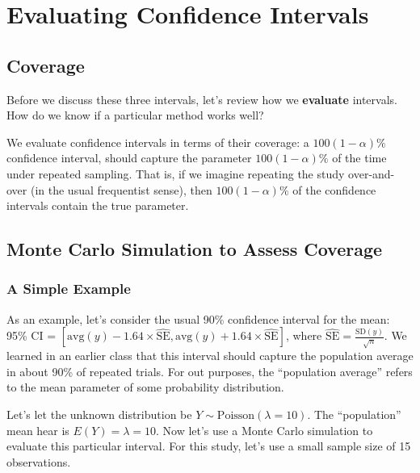 \documentclass[
]{book}
\begin{document}
\hypertarget{evaluating-confidence-intervals}{%
\section{Evaluating Confidence Intervals}\label{evaluating-confidence-intervals}}

\hypertarget{coverage}{%
\subsection{Coverage}\label{coverage}}

Before we discuss these three intervals, let's review how we \textbf{evaluate} intervals. How do we know if a particular method works well?

We evaluate confidence intervals in terms of their coverage: a \(100(1 - \alpha)\%\) confidence interval, should capture the parameter \(100(1 - \alpha)\%\) of the time under repeated sampling. That is, if we imagine repeating the study over-and-over (in the usual frequentist sense), then \(100(1 - \alpha)\%\) of the confidence intervals contain the true parameter.

\hypertarget{monte-carlo-simulation-to-assess-coverage}{%
\subsection{Monte Carlo Simulation to Assess Coverage}\label{monte-carlo-simulation-to-assess-coverage}}

\hypertarget{a-simple-example}{%
\subsubsection{A Simple Example}\label{a-simple-example}}

As an example, let's consider the usual 90\% confidence interval for the mean: 95\% CI = \([\text{avg}(y) - 1.64 \times \hat{\text{SE}}, \text{avg}(y) + 1.64 \times \hat{\text{SE}}]\), where \(\hat{\text{SE}} = \frac{\text{SD}(y)}{\sqrt{n}}\). We learned in an earlier class that this interval should capture the population average in about 90\% of repeated trials. For out purposes, the ``population average'' refers to the mean parameter of some probability distribution.

Let's let the unknown distribution be \(Y \sim \text{Poisson}(\lambda = 10)\). The ``population'' mean hear is \(E(Y) = \lambda = 10\). Now let's use a Monte Carlo simulation to evaluate this particular interval. For this study, let's use a small sample size of 15 observations.
\end{document}
